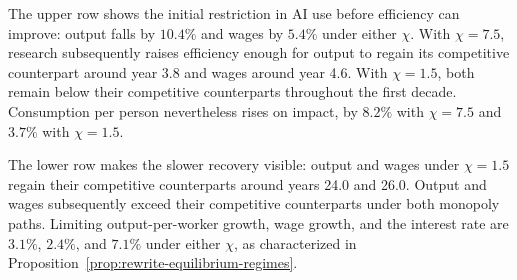 The upper row shows the initial restriction in AI use before efficiency
can improve: output falls by $10.4\%$ and wages by $5.4\%$ under either
$\chi$. %
With $\chi=7.5$, research subsequently raises
efficiency enough for output to regain its competitive counterpart around
year 3.8 and wages around year 4.6. With $\chi=1.5$, both remain below
their competitive counterparts throughout the first decade. Consumption per person nevertheless rises on impact, by $8.2\%$ with
$\chi=7.5$ and $3.7\%$ with $\chi=1.5$. %

The lower row makes the slower recovery visible: output and wages under
$\chi=1.5$ regain their competitive counterparts around years 24.0 and
26.0. Output and wages subsequently exceed their competitive counterparts
under both monopoly paths.
Limiting output-per-worker growth, wage growth, and the interest rate are
$3.1\%$, $2.4\%$, and $7.1\%$ under either $\chi$, as characterized in
Proposition~\ref{prop:rewrite-equilibrium-regimes}.


